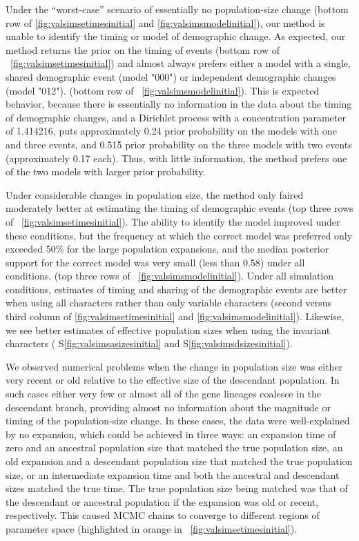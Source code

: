 \ifembed{

}{}

\ifembed{

}{}

Under the ``worst-case'' scenario of essentially no population-size change
(bottom row of \figs \ref{fig:valsimsetimesinitial} and
\ref{fig:valsimsmodelinitial}),
our method is unable to identify the timing or model of demographic change.
As expected, our method returns the prior on the timing of events 
(bottom row of \fig{}~\ref{fig:valsimsetimesinitial})
and almost always prefers either a model with a single, shared demographic
event (model "000") or independent demographic changes (model "012").
(bottom row of \fig{}~\ref{fig:valsimsmodelinitial}).
This is expected behavior, because there is essentially no information in the
data about the timing of demographic changes, and a Dirichlet process with a
concentration parameter of 1.414216, puts approximately 0.24 prior probability
on the models with one and three events, and 0.515 prior probability on the
three models with two events (approximately 0.17 each).
Thus, with little information, the method prefers one of the two models with
larger prior probability.

Under considerable changes in population size, the method only faired
moderately better at estimating the timing of demographic events
(top three rows of \fig{}~\ref{fig:valsimsetimesinitial}).
The ability to identify the model improved under these
conditions, but the frequency at which the correct model
was preferred only exceeded 50\% for the large population
expansions, and the median posterior support for the correct
model was very small (less than 0.58) under all conditions.
(top three rows of \fig{}~\ref{fig:valsimsmodelinitial}).
Under all simulation conditions, estimates of timing and sharing
of the demographic events are better when using all characters
rather than only variable characters
(second versus third column of \figs
\ref{fig:valsimsetimesinitial}
and
\ref{fig:valsimsmodelinitial}).
Likewise, we see better estimates of effective population sizes when using the
invariant characters
(\figs
S\ref{fig:valsimsasizesinitial}
and
S\ref{fig:valsimsdsizesinitial}).


We observed numerical problems when the change in population size was
either very recent or old relative to the effective size of the descendant
population.
In such cases either very few or almost all of the gene lineages coalesce in
the descendant branch, providing almost no information about the magnitude or
timing of the population-size change.
In these cases, the data were well-explained by no expansion, which could be
achieved in three ways: an expansion time of zero and an ancestral population
size that matched the true population size, an old expansion and a
descendant population size that matched the true population size, or an
intermediate expansion time and both the ancestral and descendant sizes matched the
true time.
The true population size being matched was that of the descendant or ancestral
population if the expansion was old or recent, respectively.
This caused MCMC chains to converge to different regions of parameter
space
(highlighted in orange in \fig{}~\ref{fig:valsimsetimesinitial}).


